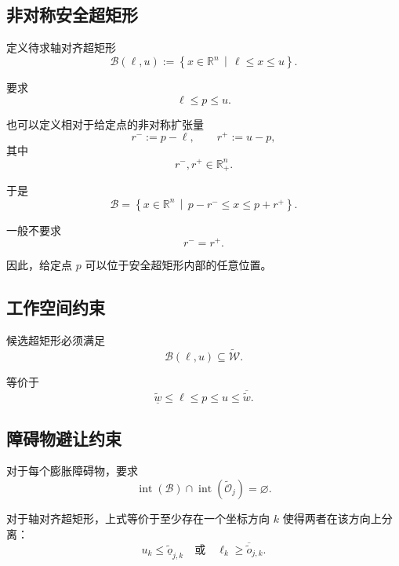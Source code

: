\documentclass[UTF8,12pt,a4paper]{ctexart}
\newcommand{\R}{\mathbb{R}}
\newcommand{\interior}{\operatorname{int}}
\begin{document}
\subsection{非对称安全超矩形}

定义待求轴对齐超矩形
\begin{equation}
    \mathcal B(\ell,u)
    :=
    \left\{
    x\in\R^n
    \,\middle|\,
    \ell\le x\le u
    \right\}.
\end{equation}

要求
\begin{equation}
    \ell\le p\le u.
\end{equation}

也可以定义相对于给定点的非对称扩张量
\begin{equation}
    r^-:=p-\ell,
    \qquad
    r^+:=u-p,
\end{equation}
其中
\[
r^-,r^+\in\R_+^n.
\]

于是
\begin{equation}
    \mathcal B
    =
    \left\{
    x\in\R^n
    \,\middle|\,
    p-r^-\le x\le p+r^+
    \right\}.
\end{equation}

一般不要求
\[
r^-=r^+.
\]

因此，给定点 $p$ 可以位于安全超矩形内部的任意位置。

\subsection{工作空间约束}

候选超矩形必须满足
\begin{equation}
    \mathcal B(\ell,u)
    \subseteq
    \widetilde{\mathcal W}.
\end{equation}

等价于
\begin{equation}
    \underline{\widetilde w}
    \le\ell\le p\le u
    \le\overline{\widetilde w}.
\end{equation}

\subsection{障碍物避让约束}

对于每个膨胀障碍物，要求
\begin{equation}
    \interior(\mathcal B)
    \cap
    \interior(\widetilde{\mathcal O}_j)
    =
    \varnothing.
\end{equation}

对于轴对齐超矩形，上式等价于至少存在一个坐标方向 $k$ 使得两者在该方向上分离：
\begin{equation}
    u_k\le \underline{\widetilde o}_{j,k}
    \quad\text{或}\quad
    \ell_k\ge \overline{\widetilde o}_{j,k}.
\end{equation}
\end{document}
